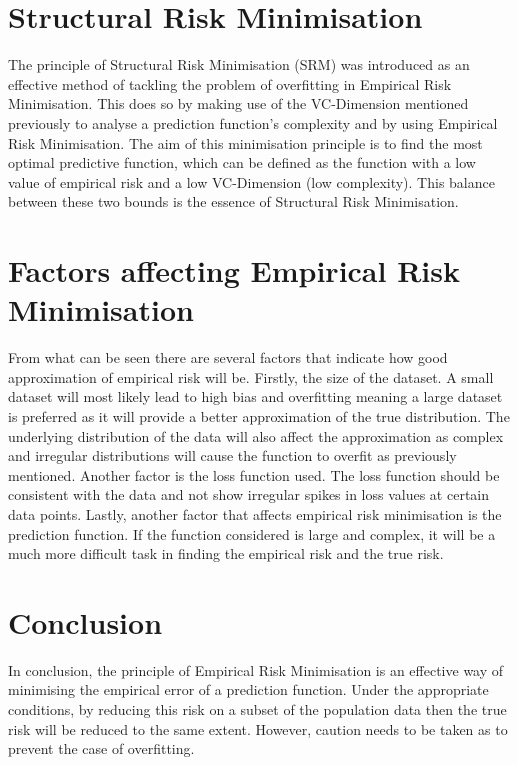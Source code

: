 \section{Structural Risk Minimisation}
The principle of Structural Risk Minimisation (SRM) was introduced as an effective method of tackling the problem of overfitting in Empirical Risk Minimisation. This does so by making use of the VC-Dimension mentioned previously to analyse a prediction function's complexity and by using Empirical Risk Minimisation. The aim of this minimisation principle is to find the most optimal predictive function, which can be defined as the function with a low value of empirical risk and a low VC-Dimension (low complexity). This balance between these two bounds is the essence of Structural Risk Minimisation.

\section{Factors affecting Empirical Risk Minimisation}

From what can be seen there are several factors that indicate how good approximation of empirical risk will be. Firstly, the size of the dataset. A small dataset will most likely lead to high bias and overfitting meaning a large dataset is preferred as it will provide a better approximation of the true distribution. The underlying distribution of the data will also affect the approximation as complex and irregular distributions will cause the function to overfit as previously mentioned. Another factor is the loss function used. The loss function should be consistent with the data and not show irregular spikes in loss values at certain data points. Lastly, another factor that affects empirical risk minimisation is the prediction function. If the function considered is large and complex, it will be a much more difficult task in finding the empirical risk and the true risk. 

\section{Conclusion}
In conclusion, the principle of Empirical Risk Minimisation is an effective way of minimising the empirical error of a prediction function. Under the appropriate conditions, by reducing this risk on a subset of the population data then the true risk will be reduced to the same extent. However, caution needs to be taken as to prevent the case of overfitting.

